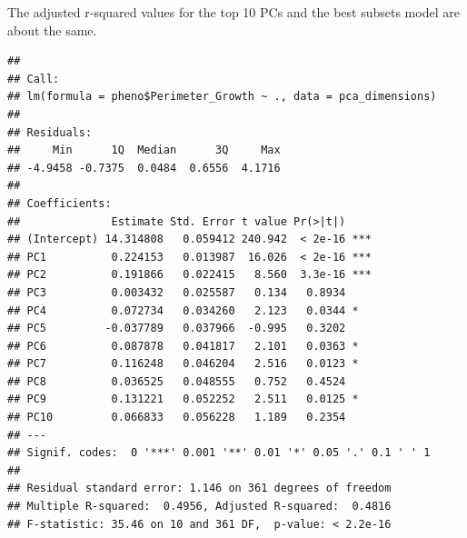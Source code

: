 \documentclass[
]{article}
\newenvironment{Shaded}{\begin{snugshade}}{\end{snugshade}}
\newcommand{\AttributeTok}[1]{\textcolor[rgb]{0.13,0.29,0.53}{#1}}
\newcommand{\CommentTok}[1]{\textcolor[rgb]{0.56,0.35,0.01}{\textit{#1}}}
\newcommand{\DecValTok}[1]{\textcolor[rgb]{0.00,0.00,0.81}{#1}}
\newcommand{\FunctionTok}[1]{\textcolor[rgb]{0.13,0.29,0.53}{\textbf{#1}}}
\newcommand{\NormalTok}[1]{#1}
\newcommand{\OtherTok}[1]{\textcolor[rgb]{0.56,0.35,0.01}{#1}}
\newcommand{\SpecialCharTok}[1]{\textcolor[rgb]{0.81,0.36,0.00}{\textbf{#1}}}
\begin{document}
The adjusted r-squared values for the top 10 PCs and the best subsets
model are about the same.

\begin{Shaded}
\end{Shaded}

\begin{verbatim}
## 
## Call:
## lm(formula = pheno$Perimeter_Growth ~ ., data = pca_dimensions)
## 
## Residuals:
##     Min      1Q  Median      3Q     Max 
## -4.9458 -0.7375  0.0484  0.6556  4.1716 
## 
## Coefficients:
##              Estimate Std. Error t value Pr(>|t|)    
## (Intercept) 14.314808   0.059412 240.942  < 2e-16 ***
## PC1          0.224153   0.013987  16.026  < 2e-16 ***
## PC2          0.191866   0.022415   8.560  3.3e-16 ***
## PC3          0.003432   0.025587   0.134   0.8934    
## PC4          0.072734   0.034260   2.123   0.0344 *  
## PC5         -0.037789   0.037966  -0.995   0.3202    
## PC6          0.087878   0.041817   2.101   0.0363 *  
## PC7          0.116248   0.046204   2.516   0.0123 *  
## PC8          0.036525   0.048555   0.752   0.4524    
## PC9          0.131221   0.052252   2.511   0.0125 *  
## PC10         0.066833   0.056228   1.189   0.2354    
## ---
## Signif. codes:  0 '***' 0.001 '**' 0.01 '*' 0.05 '.' 0.1 ' ' 1
## 
## Residual standard error: 1.146 on 361 degrees of freedom
## Multiple R-squared:  0.4956, Adjusted R-squared:  0.4816 
## F-statistic: 35.46 on 10 and 361 DF,  p-value: < 2.2e-16
\end{verbatim}

\newpage

\vspace{2cm}
\end{document}
